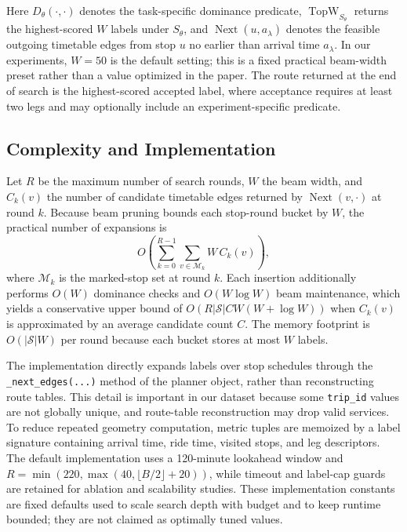 Here \(D_{\theta}(\cdot,\cdot)\) denotes the task-specific dominance predicate,
\(\operatorname{TopW}_{S_{\theta}}\) returns the highest-scored \(W\) labels
under \(S_{\theta}\), and \(\operatorname{Next}(u,a_{\lambda})\) denotes the
feasible outgoing timetable edges from stop \(u\) no earlier than arrival time
\(a_{\lambda}\). In our experiments, \(W=50\) is the default setting; this is
a fixed practical beam-width preset rather than a value optimized in the paper.
The route returned at the end of search is the highest-scored accepted label,
where acceptance requires at least two legs and may optionally include an
experiment-specific predicate.

\subsection{Complexity and Implementation}
Let \(R\) be the maximum number of search rounds, \(W\) the beam width, and
\(C_k(v)\) the number of candidate timetable edges returned by
\(\operatorname{Next}(v,\cdot)\) at round \(k\).
Because beam pruning bounds each stop-round bucket by \(W\), the practical
number of expansions is
\begin{equation}
    \label{eq:complexity}
    O\!\left(
    \sum_{k=0}^{R-1}
    \sum_{v \in \mathcal{M}_k}
    W \, C_k(v)
    \right),
\end{equation}
where \(\mathcal{M}_k\) is the marked-stop set at round \(k\).
Each insertion additionally performs \(O(W)\) dominance checks and
\(O(W\log W)\) beam maintenance, which yields a conservative upper bound of
\(O(R|\mathcal{S}|CW(W+\log W))\) when \(C_k(v)\) is approximated by an average
candidate count \(C\).
The memory footprint is \(O(|\mathcal{S}|W)\) per round because each bucket stores
at most \(W\) labels.

The implementation directly expands labels over stop schedules through the
\texttt{\_next\_edges(...)} method of the planner object, rather than reconstructing route tables.
This detail is important in our dataset because some \texttt{trip\_id} values are
not globally unique, and route-table reconstruction may drop valid services.
To reduce repeated geometry computation, metric tuples are memoized by a label
signature containing arrival time, ride time, visited stops, and leg descriptors.
The default implementation uses a 120-minute lookahead window and
\(R=\min(220,\max(40,\lfloor B/2 \rfloor + 20))\), while timeout and label-cap
guards are retained for ablation and scalability studies. These implementation
constants are fixed defaults used to scale search depth with budget and to keep
runtime bounded; they are not claimed as optimally tuned values.

